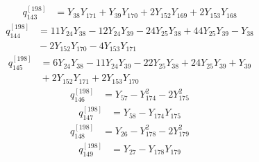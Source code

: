 \begin{equation}\label{q198:row:143}
\begin{aligned}
q_{143}^{[198]} &={} Y_{38}Y_{171} + Y_{39}Y_{170} + 2Y_{152}Y_{169} + 2Y_{153}Y_{168}
\end{aligned}
\end{equation}
\begin{equation}\label{q198:row:144}
\begin{aligned}
q_{144}^{[198]} &={} 11Y_{24}Y_{38} - 12Y_{24}Y_{39} - 24Y_{25}Y_{38} + 44Y_{25}Y_{39} - Y_{38}\\
&{} - 2Y_{152}Y_{170} - 4Y_{153}Y_{171}
\end{aligned}
\end{equation}
\begin{equation}\label{q198:row:145}
\begin{aligned}
q_{145}^{[198]} &={} 6Y_{24}Y_{38} - 11Y_{24}Y_{39} - 22Y_{25}Y_{38} + 24Y_{25}Y_{39} + Y_{39}\\
&{} + 2Y_{152}Y_{171} + 2Y_{153}Y_{170}
\end{aligned}
\end{equation}
\begin{equation}\label{q198:row:146}
\begin{aligned}
q_{146}^{[198]} &={} Y_{57} - Y_{174}^{2} - 2Y_{175}^{2}
\end{aligned}
\end{equation}
\begin{equation}\label{q198:row:147}
\begin{aligned}
q_{147}^{[198]} &={} Y_{58} - Y_{174}Y_{175}
\end{aligned}
\end{equation}
\begin{equation}\label{q198:row:148}
\begin{aligned}
q_{148}^{[198]} &={} Y_{26} - Y_{178}^{2} - 2Y_{179}^{2}
\end{aligned}
\end{equation}
\begin{equation}\label{q198:row:149}
\begin{aligned}
q_{149}^{[198]} &={} Y_{27} - Y_{178}Y_{179}
\end{aligned}
\end{equation}
